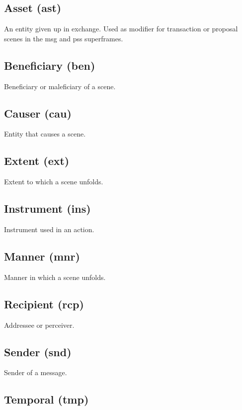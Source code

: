 \documentclass[a4paper]{article}
\begin{document}
\subsection{Asset (ast)}

An entity given up in exchange. Used as modifier for transaction or proposal scenes in the msg and pss superframes.

\subsection{Beneficiary (ben)}

Beneficiary or maleficiary of a scene.

\subsection{Causer (cau)}

Entity that causes a scene.

\subsection{Extent (ext)}

Extent to which a scene unfolds.

\subsection{Instrument (ins)}

Instrument used in an action.

\subsection{Manner (mnr)}

Manner in which a scene unfolds.

\subsection{Recipient (rcp)}

Addressee or perceiver.

\subsection{Sender (snd)}

Sender of a message.

\subsection{Temporal (tmp)}
\end{document}
